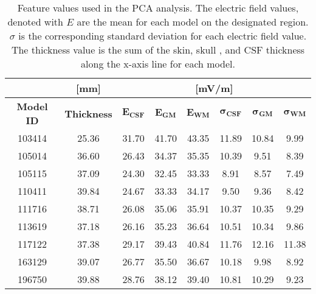 \begin{table}[!ht]
	\centering
    \caption[\gls{PCA} feature values]{Feature values used in the \gls{PCA} analysis. The electric field values, denoted with $E$ are the mean for each model on the designated region. $\sigma$ is the corresponding standard deviation for each electric field value. The thickness value is the sum of the skin, skull , and \gls{CSF} thickness along the x-axis line for each model.}
    \label{tab:pca_features}
    \begin{tabular}{|c|c|c|c|c|c|c|c|}
        \cline{2-8}
        \multicolumn{1}{c|}{} & \cellcolor[HTML]{C0C0C0}\textbf{[mm]} & \multicolumn{6}{c|}{\cellcolor[HTML]{C0C0C0}\textbf{[mV/m]}} \\ \hline
        \rowcolor[HTML]{C0C0C0} 
        \textbf{Model ID} & \textbf{Thickness} &  $\boldsymbol{E_{CSF}}$ & $\boldsymbol{E_{GM}}$ & $\boldsymbol{E_{WM}}$ & $\boldsymbol{\sigma_{CSF}}$ & $\boldsymbol{\sigma_{GM}}$ & $\boldsymbol{\sigma_{WM}}$ \\\hline
        103414 & 25.36 &             31.70 &            41.70 &            43.35 &            11.89 &           10.84 &            9.99 \\\hline
        105014 & 36.60 &             26.43 &            34.37 &            35.35 &            10.39 &            9.51 &            8.39 \\\hline
        105115 & 37.09 &             24.30 &            32.45 &            33.33 &             8.91 &            8.57 &            7.49 \\\hline
        110411 & 39.84 &             24.67 &            33.33 &            34.17 &             9.50 &            9.36 &            8.42 \\\hline
        111716 & 38.71 &             26.08 &            35.06 &            35.91 &            10.37 &           10.35 &            9.29 \\\hline
        113619 & 37.18 &             26.16 &            35.23 &            36.64 &            10.51 &           10.34 &            9.86 \\\hline
        117122 & 37.38 &             29.17 &            39.43 &            40.84 &            11.76 &           12.16 &           11.38 \\\hline
        163129 & 39.07 &             26.77 &            35.50 &            36.67 &            10.18 &            9.98 &            8.92 \\\hline
        196750 & 39.88 &             28.76 &            38.12 &            39.40 &            10.81 &           10.29 &            9.23 \\\hline
    \end{tabular}
\end{table}

